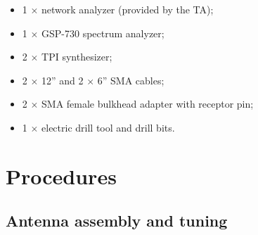 \documentclass[letterpaper, 11pt]{article}
\begin{document}
\begin{itemize}[itemsep=0.5ex]
	\item 1 $\times$ network analyzer (provided by the TA);
	\item 1 $\times$ GSP-730 spectrum analyzer;
	\item 2 $\times$ TPI synthesizer;
	\item 2 $\times$ 12'' and 2 $\times$ 6'' SMA cables;
	\item 2 $\times$ SMA female bulkhead adapter with receptor pin;
	\item 1 $\times$ electric drill tool and drill bits.
\end{itemize}


\section{Procedures}

\subsection{Antenna assembly and tuning}
\label{sec:antenna_assbly}
\end{document}
